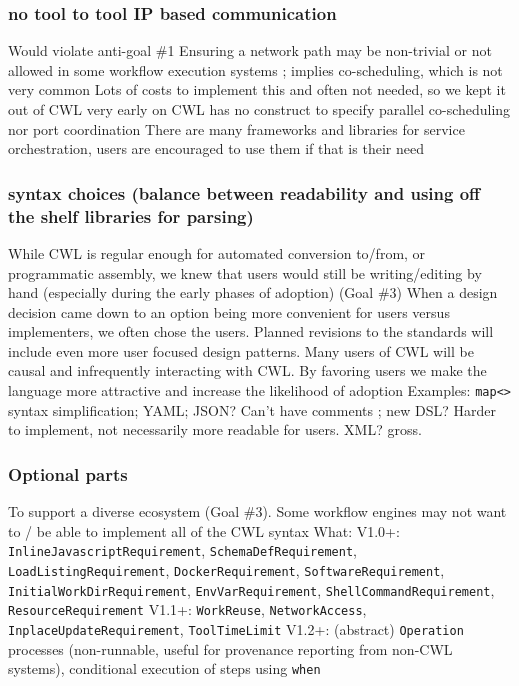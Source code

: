 \subsubsection{no tool to tool IP based communication}
Would violate anti-goal \#1
Ensuring a network path may be non-trivial or not allowed in some workflow execution systems ; implies co-scheduling, which is not very common
Lots of costs to implement this and often not needed, so we kept it out of CWL very early on
CWL has no construct to specify parallel co-scheduling nor port coordination
There are many frameworks and libraries for service orchestration, users are encouraged to use them if that is their need

\subsubsection{syntax choices (balance between readability and using off the shelf libraries for parsing)}
While CWL is regular enough for automated conversion to/from, or programmatic assembly, we knew that users would still be writing/editing by hand (especially during the early phases of adoption) (Goal \#3)
When a design decision came down to an option being more convenient for users versus implementers, we often chose the users. Planned revisions to the standards will include even more user focused design patterns.
Many users of CWL will be causal and infrequently interacting with CWL. By favoring users we make the language more attractive and increase the likelihood of adoption
Examples: \verb|map<>| syntax simplification; YAML;
JSON? Can’t have comments ; new DSL? Harder to implement, not necessarily more readable for users. XML? gross.

\subsubsection{Optional parts}

To support a diverse ecosystem (Goal \#3). Some workflow engines may not want to / be able to implement all of the CWL syntax
What:
V1.0+: \verb|InlineJavascriptRequirement|, \verb|SchemaDefRequirement|, \verb|LoadListingRequirement|, \verb|DockerRequirement|, \verb|SoftwareRequirement|, \verb|InitialWorkDirRequirement|, \verb|EnvVarRequirement|, \verb|ShellCommandRequirement|, \verb|ResourceRequirement|
V1.1+: \verb|WorkReuse|, \verb|NetworkAccess|, \verb|InplaceUpdateRequirement|, \verb|ToolTimeLimit|
V1.2+: (abstract) \verb|Operation| processes (non-runnable, useful for provenance reporting from non-CWL systems), conditional execution of steps using \verb|when|

